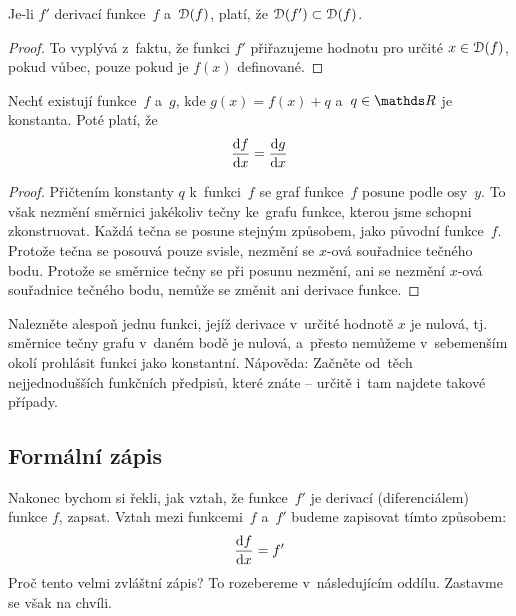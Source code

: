 \begin{lemma}
    Je-li $f'$ derivací funkce~$f$ a~$\mathcal{D}(f)$, platí, že
    ${\mathcal{D}(f') \subset \mathcal{D}(f)}$.

    \begin{proof}
        To vyplývá z~faktu, že funkci $f'$ přiřazujeme hodnotu pro určité
        ${x \in \mathcal{D}(f)}$, pokud vůbec, pouze pokud je $f(x)$ definované.
    \end{proof}
\end{lemma}

\begin{lemma}
    Nechť existují funkce~$f$ a~$g$, kde ${g(x) = f(x) + q}$
    a~${q \in \reals}$ je konstanta. Poté platí, že
    \begin{equation*}
        \frac{\mathrm{d} f}{\mathrm{d} x} = \frac{\mathrm{d} g}{\mathrm{d} x}
    \end{equation*}

    \begin{proof}
        Přičtením konstanty $q$ k~funkci~$f$ se graf funkce~$f$ posune podle
        osy~$y$. To však nezmění směrnici jakékoliv tečny ke~grafu funkce, kterou
        jsme schopni zkonstruovat. Každá tečna se posune stejným způsobem, jako
        původní funkce~$f$. Protože tečna se posouvá pouze svisle, nezmění se
        $x$-ová souřadnice tečného bodu. Protože se směrnice tečny se při posunu
        nezmění, ani se nezmění $x$-ová souřadnice tečného bodu, nemůže se změnit
        ani derivace funkce.
    \end{proof}
\end{lemma}

\begin{exercise}
    Nalezněte alespoň jednu funkci, jejíž derivace v~určité hodnotě $x$ je nulová,
    tj. směrnice tečny grafu v~daném bodě je nulová, a~přesto nemůžeme v~sebemenším
    okolí prohlásit funkci jako konstantní. Nápověda: Začněte od~těch nejjednodušších
    funkčních předpisů, které znáte -- určitě i~tam najdete takové případy.
\end{exercise}

\subsection{Formální zápis}
\label{subsec:derivace-formalni-zapis}

Nakonec bychom si řekli, jak vztah, že funkce~$f'$ je derivací (diferenciálem) funkce
$f$, zapsat. Vztah mezi funkcemi~$f$ a~$f'$ budeme zapisovat tímto způsobem:
\begin{equation*}
    \frac{\mathrm{d} f}{\mathrm{d} x} = f'
\end{equation*}
Proč tento velmi zvláštní zápis? To rozebereme v~následujícím oddílu. Zastavme se
však na chvíli.

